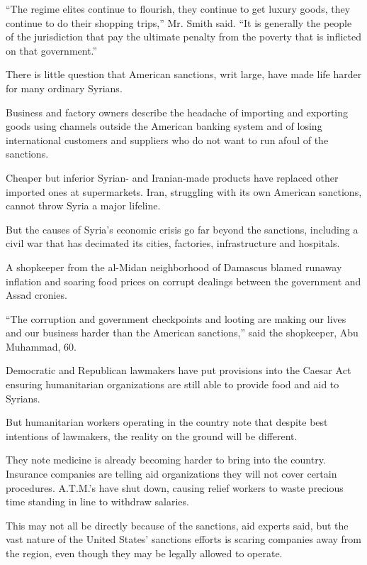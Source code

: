 ``The regime elites continue to flourish, they continue to get luxury
goods, they continue to do their shopping trips,'' Mr. Smith said. ``It
is generally the people of the jurisdiction that pay the ultimate
penalty from the poverty that is inflicted on that government.''

There is little question that American sanctions, writ large, have made
life harder for many ordinary Syrians.

Business and factory owners describe the headache of importing and
exporting goods using channels outside the American banking system and
of losing international customers and suppliers who do not want to run
afoul of the sanctions.

Cheaper but inferior Syrian- and Iranian-made products have replaced
other imported ones at supermarkets. Iran, struggling with its own
American sanctions, cannot throw Syria a major lifeline.

But the causes of Syria's economic crisis go far beyond the sanctions,
including a civil war that has decimated its cities, factories,
infrastructure and hospitals.

A shopkeeper from the al-Midan neighborhood of Damascus blamed runaway
inflation and soaring food prices on corrupt dealings between the
government and Assad cronies.

``The corruption and government checkpoints and looting are making our
lives and our business harder than the American sanctions,'' said the
shopkeeper, Abu Muhammad, 60.

Democratic and Republican lawmakers have put provisions into the Caesar
Act ensuring humanitarian organizations are still able to provide food
and aid to Syrians.

But humanitarian workers operating in the country note that despite best
intentions of lawmakers, the reality on the ground will be different.

They note medicine is already becoming harder to bring into the country.
Insurance companies are telling aid organizations they will not cover
certain procedures. A.T.M.'s have shut down, causing relief workers to
waste precious time standing in line to withdraw salaries.

This may not all be directly because of the sanctions, aid experts said,
but the vast nature of the United States' sanctions efforts is scaring
companies away from the region, even though they may be legally allowed
to operate.

\href{https://www.nytimes.com/news-event/coronavirus?action=click\&pgtype=Article\&state=default\&region=MAIN_CONTENT_3\&context=storylines_faq}{}

